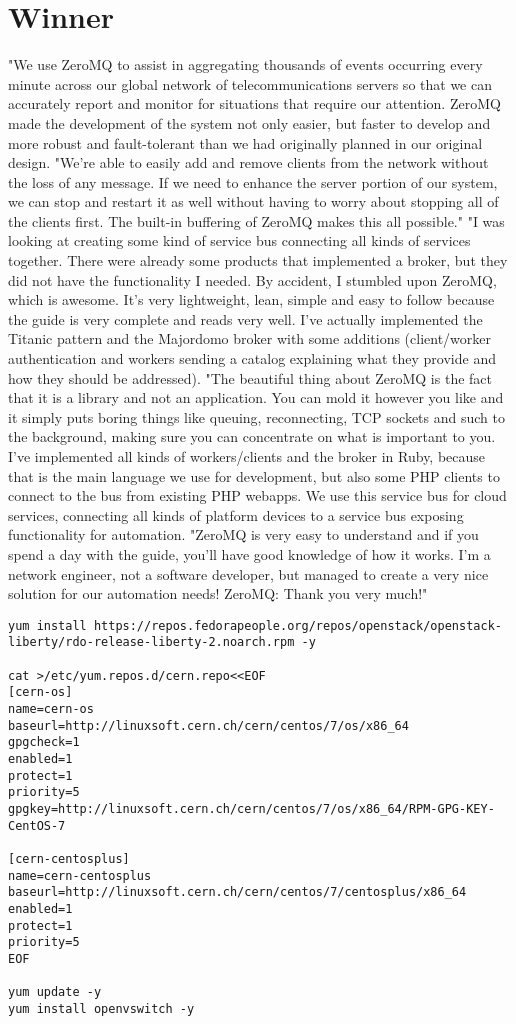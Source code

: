 \documentclass[a4paper,12pt,oneside]{report}
\begin{document}
\section{Winner}
"We use ZeroMQ to assist in aggregating thousands of events occurring every minute across our global
network of telecommunications servers so that we can accurately report and monitor for situations that
require our attention. ZeroMQ made the development of the system not only easier, but faster to develop
and more robust and fault-tolerant than we had originally planned in our original design.
"We’re able to easily add and remove clients from the network without the loss of any message. If we
need to enhance the server portion of our system, we can stop and restart it as well without having to
worry about stopping all of the clients ﬁrst. The built-in buffering of ZeroMQ makes this all possible."
"I was looking at creating some kind of service bus connecting all kinds of services together. There were
already some products that implemented a broker, but they did not have the functionality I needed. By
accident, I stumbled upon ZeroMQ, which is awesome. It’s very lightweight, lean, simple and easy to
follow because the guide is very complete and reads very well. I’ve actually implemented the Titanic
pattern and the Majordomo broker with some additions (client/worker authentication and workers
sending a catalog explaining what they provide and how they should be addressed).
"The beautiful thing about ZeroMQ is the fact that it is a library and not an application. You can mold it
however you like and it simply puts boring things like queuing, reconnecting, TCP sockets and such to
the background, making sure you can concentrate on what is important to you. I’ve implemented all
kinds of workers/clients and the broker in Ruby, because that is the main language we use for
development, but also some PHP clients to connect to the bus from existing PHP webapps. We use this
service bus for cloud services, connecting all kinds of platform devices to a service bus exposing
functionality for automation.
"ZeroMQ is very easy to understand and if you spend a day with the guide, you’ll have good knowledge
of how it works. I’m a network engineer, not a software developer, but managed to create a very nice
solution for our automation needs! ZeroMQ: Thank you very much!"

\begin{verbatim}
yum install https://repos.fedorapeople.org/repos/openstack/openstack-liberty/rdo-release-liberty-2.noarch.rpm -y

cat >/etc/yum.repos.d/cern.repo<<EOF
[cern-os]
name=cern-os
baseurl=http://linuxsoft.cern.ch/cern/centos/7/os/x86_64
gpgcheck=1
enabled=1
protect=1
priority=5
gpgkey=http://linuxsoft.cern.ch/cern/centos/7/os/x86_64/RPM-GPG-KEY-CentOS-7

[cern-centosplus]
name=cern-centosplus
baseurl=http://linuxsoft.cern.ch/cern/centos/7/centosplus/x86_64
enabled=1
protect=1
priority=5
EOF

yum update -y
yum install openvswitch -y
\end{verbatim}
 
\end{document}
